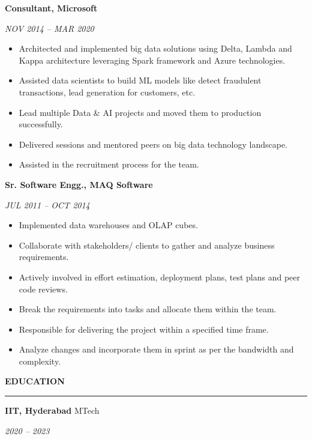 \documentclass[10pt, a4paper]{article}
\newcommand{\cvsection}[1]{%
  \vspace{1.2\baselineskip}%
  {\large\bfseries\sffamily\MakeUppercase{#1}}\par\vspace{0.4ex}%
  {\color{black!70}\hrule height 0.8pt}\par
  \vspace{0.8\baselineskip}%
}
\begin{document}
\begin{paracol}{2}
{\bfseries Consultant, Microsoft}\par
\vspace{0.5ex} %
{\color{dategray}\itshape\MakeUppercase{Nov 2014 – Mar 2020}}
\vspace{1.0ex} %
\begin{itemize}
    \item Architected and implemented big data solutions using Delta, Lambda and Kappa architecture leveraging Spark framework and Azure technologies.
    \item Assisted data scientists to build ML models like detect fraudulent transactions, lead generation for customers, etc.
    \item Lead multiple Data \& AI projects and moved them to production successfully.
    \item Delivered sessions and mentored peers on big data technology landscape.
    \item Assisted in the recruitment process for the team.
\end{itemize}
\vspace{1.2\baselineskip} %

{\bfseries Sr. Software Engg., MAQ Software}\par
\vspace{0.5ex} %
{\color{dategray}\itshape\MakeUppercase{Jul 2011 – Oct 2014}}
\vspace{1.0ex} %
\begin{itemize}
    \item Implemented data warehouses and OLAP cubes. 
    \item Collaborate with stakeholders/ clients to gather and analyze business requirements.
    \item Actively involved in effort estimation, deployment plans, test plans and peer code reviews.
    \item Break the requirements into tasks and allocate them within the team.
    \item Responsible for delivering the project within a specified time frame.
    \item Analyze changes and incorporate them in sprint as per the bandwidth and complexity.
\end{itemize}

\cvsection{Education}
{\bfseries IIT, Hyderabad} \hfill MTech \par
\textit{2020 – 2023}
\vspace{2ex}


\end{paracol}
\end{document}
